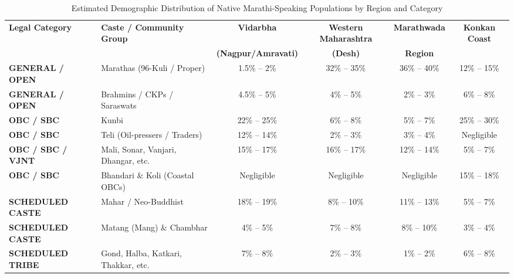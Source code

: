 \documentclass{article}
\begin{document}
\begin{table}[htbp]
\centering
\caption{Estimated Demographic Distribution of Native Marathi-Speaking Populations by Region and Category}
\label{tab:marathi-demographics}
\vspace{0.5em}
\small
\begin{tabular}{llcccc}
\toprule
\textbf{Legal Category} & \textbf{Caste / Community Group} & \textbf{Vidarbha} & \textbf{Western Maharashtra} & \textbf{Marathwada} & \textbf{Konkan Coast} \\ 
 & & \textbf{(Nagpur/Amravati)} & \textbf{(Desh)} & \textbf{Region} & \\ 
\midrule
\textbf{GENERAL / OPEN} & Marathas (96-Kuli / Proper) & 1.5\% – 2\% & 32\% – 35\% & 36\% – 40\% & 12\% – 15\% \\ 
\textbf{GENERAL / OPEN} & Brahmins / CKPs / Saraswats & 4.5\% – 5\% & 4\% – 5\% & 2\% – 3\% & 6\% – 8\% \\ 
\addlinespace
\textbf{OBC / SBC} & Kunbi & 22\% – 25\% & 6\% – 8\% & 5\% – 7\% & 25\% – 30\% \\ 
\textbf{OBC / SBC} & Teli (Oil-pressers / Traders) & 12\% – 14\% & 2\% – 3\% & 3\% – 4\% & Negligible \\ 
\textbf{OBC / SBC / VJNT} & Mali, Sonar, Vanjari, Dhangar, etc. & 15\% – 17\% & 16\% – 17\% & 12\% – 14\% & 5\% – 7\% \\ 
\textbf{OBC / SBC} & Bhandari \& Koli (Coastal OBCs) & Negligible & Negligible & Negligible & 15\% – 18\% \\ 
\addlinespace
\textbf{SCHEDULED CASTE} & Mahar / Neo-Buddhist & 18\% – 19\% & 8\% – 10\% & 11\% – 13\% & 5\% – 7\% \\ 
\textbf{SCHEDULED CASTE} & Matang (Mang) \& Chambhar & 4\% – 5\% & 7\% – 8\% & 8\% – 10\% & 3\% – 4\% \\ 
\addlinespace
\textbf{SCHEDULED TRIBE} & Gond, Halba, Katkari, Thakkar, etc. & 7\% – 8\% & 2\% – 3\% & 1\% – 2\% & 6\% – 8\% \\ 
\bottomrule
\end{tabular}
\end{table}

 
\end{document}
